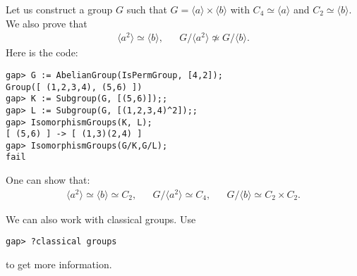 \begin{example}
Let us construct a group $G$ such that $G=\langle a\rangle\times\langle
b\rangle$ with $C_4\simeq\langle a\rangle$ and $C_2\simeq\langle b\rangle$. We
also prove that 
\begin{align*}
\langle a^2\rangle\simeq\langle b\rangle,
&&
G/\langle a^2\rangle\not\simeq G/\langle b\rangle.
\end{align*}
Here is the code:
\begin{lstlisting}
gap> G := AbelianGroup(IsPermGroup, [4,2]);
Group([ (1,2,3,4), (5,6) ])
gap> K := Subgroup(G, [(5,6)]);;
gap> L := Subgroup(G, [(1,2,3,4)^2]);;
gap> IsomorphismGroups(K, L);
[ (5,6) ] -> [ (1,3)(2,4) ]
gap> IsomorphismGroups(G/K,G/L);
fail
\end{lstlisting}
One can show that:
\begin{align*}
\langle a^2\rangle\simeq\langle b\rangle\simeq C_2,
&&
G/\langle a^2\rangle\simeq C_4,
&&
G/\langle b\rangle\simeq C_2\times C_2.
\end{align*}
\end{example}

We can also work with classical groups. Use 
\begin{lstlisting}
gap> ?classical groups
\end{lstlisting}
to get more information.

